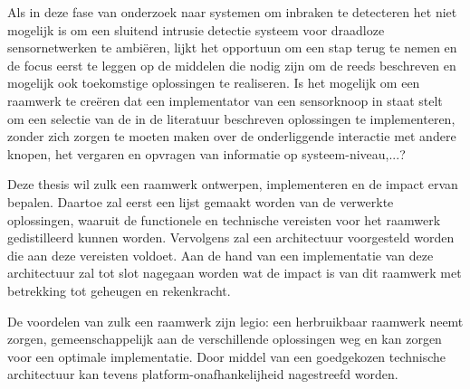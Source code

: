 Als in deze fase van onderzoek naar systemen om inbraken te detecteren het niet
mogelijk is om een sluitend intrusie detectie systeem voor draadloze
sensornetwerken te ambi\"eren, lijkt het opportuun om een stap terug te nemen
en de focus eerst te leggen op de middelen die nodig zijn om de reeds
beschreven en mogelijk ook toekomstige oplossingen te realiseren. Is het
mogelijk om een raamwerk te cre\"eren dat een implementator van een sensorknoop
in staat stelt om een selectie van de in de literatuur beschreven oplossingen
te implementeren, zonder zich zorgen te moeten maken over de onderliggende
interactie met andere knopen, het vergaren en opvragen van informatie op
systeem-niveau,...?

Deze thesis wil zulk een raamwerk ontwerpen, implementeren en de impact ervan
bepalen. Daartoe zal eerst een lijst gemaakt worden van de verwerkte
oplossingen, waaruit de functionele en technische vereisten voor het raamwerk
gedistilleerd kunnen worden. Vervolgens zal een architectuur voorgesteld worden
die aan deze vereisten voldoet. Aan de hand van een implementatie van deze
architectuur zal tot slot nagegaan worden wat de impact is van dit raamwerk met
betrekking tot geheugen en rekenkracht.

De voordelen van zulk een raamwerk zijn legio: een herbruikbaar raamwerk neemt
zorgen, gemeenschappelijk aan de verschillende oplossingen weg en kan zorgen
voor een optimale implementatie. Door middel van een goedgekozen technische
architectuur kan tevens platform-onafhankelijheid nagestreefd worden.
